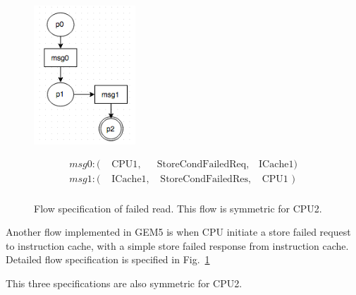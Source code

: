 \documentclass[conference]{IEEEtran}
\begin{document}
\begin{figure} 
 \centerline{
 \includegraphics[width=1.5in]{figures/storeFail.png}}
 
 {\footnotesize
 \[
 \begin{array}{llll}
 msg0: (&\mbox{ CPU1},&\mbox{StoreCondFailedReq},&\mbox{ICache1})\\                   
 msg1: (&\mbox{ ICache1},&\mbox{ StoreCondFailedRes},&\mbox{ CPU1 })\\
 \end{array}
 \]}
 \caption{Flow specification of failed read. This flow is symmetric for CPU2. }
 \label{storefail}
 
 \end{figure}
Another flow implemented in GEM5 is when CPU initiate a store failed request to instruction cache, with a simple store failed response from instruction cache. Detailed flow specification is specified in Fig.~\ref{storefail}

This three specifications are also symmetric for CPU2.
\end{document}
